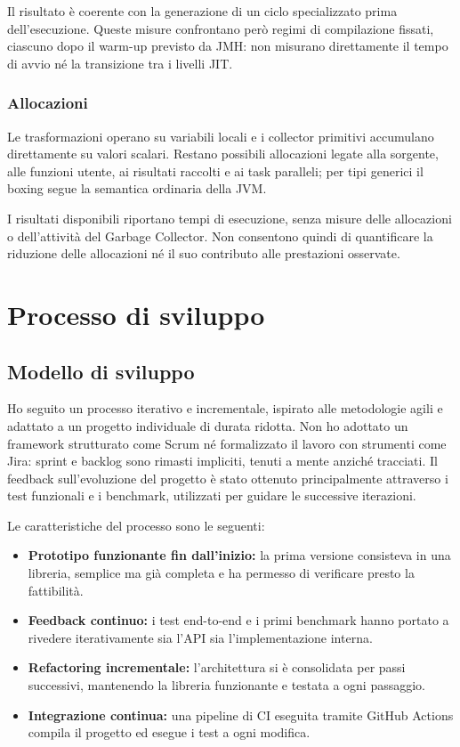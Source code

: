 \documentclass[a4paper,11pt]{report}
\theoremstyle{definition}
\begin{document}
Il risultato è coerente con la generazione di un ciclo specializzato prima dell'esecuzione. Queste misure confrontano però regimi di compilazione fissati, ciascuno dopo il warm-up previsto da JMH: non misurano direttamente il tempo di avvio né la transizione tra i livelli JIT.

\subsection{Allocazioni}
\label{subsec:bench-allocazioni}

Le trasformazioni operano su variabili locali e i collector primitivi accumulano direttamente su valori scalari. Restano possibili allocazioni legate alla sorgente, alle funzioni utente, ai risultati raccolti e ai task paralleli; per tipi generici il boxing segue la semantica ordinaria della JVM.

I risultati disponibili riportano tempi di esecuzione, senza misure delle allocazioni o dell'attività del Garbage Collector. Non consentono quindi di quantificare la riduzione delle allocazioni né il suo contributo alle prestazioni osservate.

\chapter{Processo di sviluppo}
\label{ch:processo-sviluppo}

\section{Modello di sviluppo}
\label{sec:modello-sviluppo}

Ho seguito un processo iterativo e incrementale, ispirato alle metodologie agili e adattato a un progetto individuale di durata ridotta. Non ho adottato un framework strutturato come Scrum né formalizzato il lavoro con strumenti come Jira: sprint e backlog sono rimasti impliciti, tenuti a mente anziché tracciati. Il feedback sull'evoluzione del progetto è stato ottenuto principalmente attraverso i test funzionali e i benchmark, utilizzati per guidare le successive iterazioni.

Le caratteristiche del processo sono le seguenti:
\begin{itemize}
  \item \textbf{Prototipo funzionante fin dall'inizio:} la prima versione consisteva in una libreria, semplice ma già completa e ha permesso di verificare presto la fattibilità.
  \item \textbf{Feedback continuo:} i test end-to-end e i primi benchmark hanno portato a rivedere iterativamente sia l'API sia l'implementazione interna.
  \item \textbf{Refactoring incrementale:} l'architettura si è consolidata per passi successivi, mantenendo la libreria funzionante e testata a ogni passaggio.
  \item \textbf{Integrazione continua:} una pipeline di CI eseguita tramite GitHub Actions compila il progetto ed esegue i test a ogni modifica.
\end{itemize}
\end{document}
